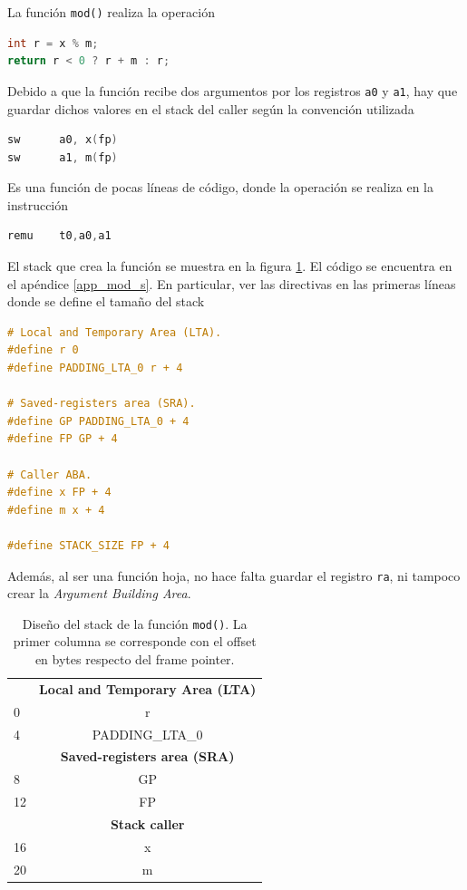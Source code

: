 La función \texttt{mod()} realiza la operación
\begin{lstlisting}[language=C, style=StyleC]
int r = x % m;
return r < 0 ? r + m : r;
\end{lstlisting}

Debido a que la función recibe dos argumentos por los registros \texttt{a0} y \texttt{a1}, hay que guardar dichos valores en el stack del caller según la convención utilizada
\begin{lstlisting}[language=C, style=StyleC]
sw      a0, x(fp)
sw      a1, m(fp)
\end{lstlisting}

Es una función de pocas líneas de código, donde la operación  se realiza en la instrucción
\begin{lstlisting}[language=C, style=StyleC]
remu    t0,a0,a1
\end{lstlisting}

El stack que crea la función se muestra en la figura \ref{stack_mod}. El código se encuentra en el apéndice \ref{app_mod_s}. En particular, ver las directivas en las primeras líneas donde se define el tamaño del stack
\begin{lstlisting}[language=C, style=StyleC]
# Local and Temporary Area (LTA).
#define r 0
#define PADDING_LTA_0 r + 4

# Saved-registers area (SRA).
#define GP PADDING_LTA_0 + 4
#define FP GP + 4

# Caller ABA.
#define x FP + 4
#define m x + 4

#define STACK_SIZE FP + 4
\end{lstlisting}

Además, al ser una función hoja, no hace falta guardar el registro \texttt{ra}, ni tampoco crear la \textit{Argument Building Area}.

\begin{table}[H]
	\centering
	\begin{tabular}{@{}l|c|@{}}
		\cmidrule(l){2-2} 
		\multicolumn{1}{c|}{\textbf{}} & \textbf{Local and Temporary Area (LTA)} \\ \cmidrule(l){2-2} 
		0 & r \\ \cmidrule(l){2-2} 
		4 & PADDING\_LTA\_0 \\ \cmidrule(l){2-2} 
		\multicolumn{1}{c|}{\textbf{}} & \textbf{Saved-registers area (SRA)} \\ \cmidrule(l){2-2} 
		8 & GP \\ \cmidrule(l){2-2} 
		12 & FP \\ \cmidrule(l){2-2} 
		\multicolumn{1}{c|}{\textbf{}} & \textbf{Stack caller} \\ \cmidrule(l){2-2} 
		16 & x \\ \cmidrule(l){2-2} 
		20 & m \\ \cmidrule(l){2-2} 
	\end{tabular}
	\caption{Diseño del stack de la función \texttt{mod()}. La primer columna se corresponde con el offset en bytes respecto del frame pointer.}
	\label{stack_mod}
\end{table}

